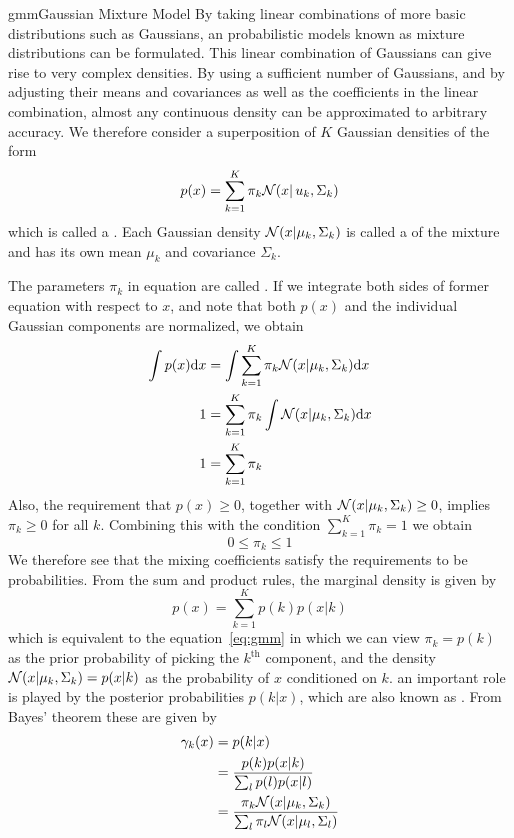 \documentclass[9pt]{article}
\begin{document}
\begin{topic}{gmm}{Gaussian Mixture Model}
By taking linear combinations of more basic distributions such as Gaussians, an probabilistic models known as mixture distributions can be formulated. This linear combination of Gaussians can give rise to very complex densities. By using a sufficient number of Gaussians, and by adjusting their means and covariances as well as the coefficients in the linear combination, almost any continuous density can be approximated to arbitrary accuracy.
We therefore consider a superposition of $K$ Gaussian densities of the form
\begin{equation}
\label{eq:gmm}
p(x) = \sum_{k=1}^{K}\pi_k\mathcal{N}(x|\,u_k,\Sigma_k)
\end{equation}
which is called a . Each Gaussian density $\mathcal{N}(x|\mu_k,\Sigma_k)$ is called a  of the mixture and has its own mean $\mu_k$ and covariance $\Sigma_k$.

The parameters $\pi_k$ in equation are called . If we integrate both sides of former equation with respect to $x$, and note that both $p(x)$ and the individual Gaussian components are normalized, we obtain
\[
\begin{split}
	\int p(x) \mathrm{d} x &= \int \sum_{k=1}^{K}\pi_k\mathcal{N}(x|\mu_k,\Sigma_k) \mathrm{d} x\\
	1 &= \sum_{k=1}^{K}\pi_k \int \mathcal{N}(x|\mu_k,\Sigma_k) \mathrm{d} x\\
	1 &= \sum_{k=1}^{K}\pi_k
\end{split}
\]
Also, the requirement that $p(x) \geq 0$, together with $\mathcal{N}(x|\mu_k,\Sigma_k)\geq 0$, implies $\pi_k \geq 0$ for all $k$. Combining this with the condition $\sum_{k=1}^{K}\pi_k = 1$ we obtain 
\[
0 \leq \pi_k \leq 1
\]
We therefore see that the mixing coefficients satisfy the requirements to be probabilities.
From the sum and product rules, the marginal density is given by
\[
p(x) = \sum_{k=1}^{K} p(k) p(x|k)
\]
which is equivalent to the equation~\ref{eq:gmm} in which we can view $\pi_k=p(k)$ as the prior probability of picking the $k^\text{th}$ component, and the density $\mathcal{N}(x|\mu_k,\Sigma_k) = p(x|k)$ as the probability of $x$ conditioned on $k$. an important role is played by the posterior probabilities $p(k|x)$, which are also known as . From Bayes' theorem these are given by
\[
\begin{split}
\gamma_k(x) &= p(k|x)\\
&= \frac{p(k)p(x|k)}{\sum_l p(l)p(x|l)}\\
&= \frac{\pi_k\mathcal{N}(x|\mu_k,\Sigma_k)}{\sum_l \pi_l \mathcal{N}(x|\mu_l,\Sigma_l)}
\end{split}
\]
\end{topic}
\end{document}
